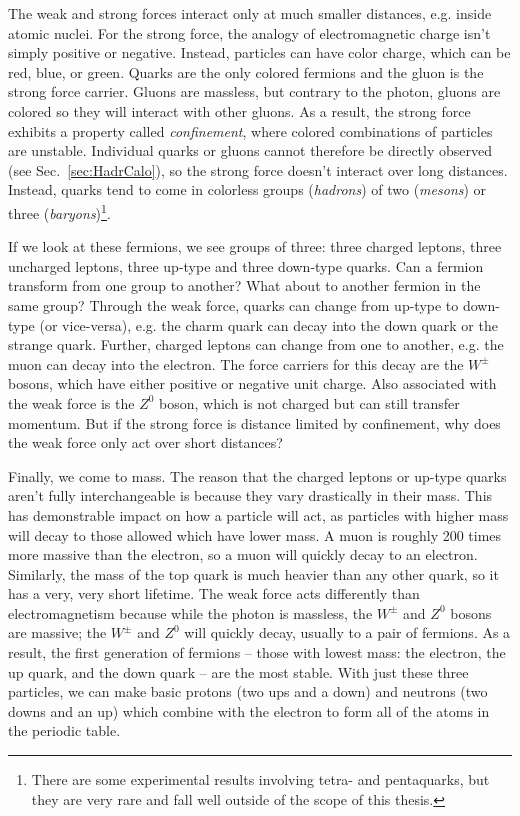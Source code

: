The weak and strong forces interact only at much smaller distances, e.g. inside atomic nuclei. For the strong force, the analogy of electromagnetic charge isn't simply positive or negative. Instead, particles can have color charge, which can be red, blue, or green. Quarks are the only colored fermions and the gluon is the strong force carrier. Gluons are massless, but contrary to the photon, gluons are colored so they will interact with other gluons. As a result, the strong force exhibits a property called \textit{confinement}, where colored combinations of particles are unstable. Individual quarks or gluons cannot therefore be directly observed (see Sec.~\ref{sec:HadrCalo}), so the strong force doesn't interact over long distances. Instead, quarks tend to come in colorless groups (\textit{hadrons}) of two (\textit{mesons}) or three (\textit{baryons})\footnote{There are some experimental results involving tetra- and pentaquarks, but they are very rare and fall well outside of the scope of this thesis.}.

If we look at these fermions, we see groups of three: three charged leptons, three uncharged leptons, three up-type and three down-type quarks. Can a fermion transform from one group to another? What about to another fermion in the same group? Through the weak force, quarks can change from up-type to down-type (or vice-versa), e.g. the charm quark can decay into the down quark or the strange quark. Further, charged leptons can change from one to another, e.g. the muon can decay into the electron. The force carriers for this decay are the $W^{\pm}$ bosons, which have either positive or negative unit charge. Also associated with the weak force is the $Z^{0}$ boson, which is not charged but can still transfer momentum. But if the strong force is distance limited by confinement, why does the weak force only act over short distances? 

Finally, we come to mass. The reason that the charged leptons or up-type quarks aren't fully interchangeable is because they vary drastically in their mass. This has demonstrable impact on how a particle will act, as particles with higher mass will decay to those allowed which have lower mass. A muon is roughly 200 times more massive than the electron, so a muon will quickly decay to an electron. Similarly, the mass of the top quark is much heavier than any other quark, so it has a very, very short lifetime. The weak force acts differently than electromagnetism because while the photon is massless, the $W^{\pm}$ and $Z^{0}$ bosons are massive; the $W^{\pm}$ and $Z^{0}$ will quickly decay, usually to a pair of fermions. As a result, the first generation of fermions -- those with lowest mass: the electron, the up quark, and the down quark -- are the most stable. With just these three particles, we can make basic protons (two ups and a down) and neutrons (two downs and an up) which combine with the electron to form all of the atoms in the periodic table.


